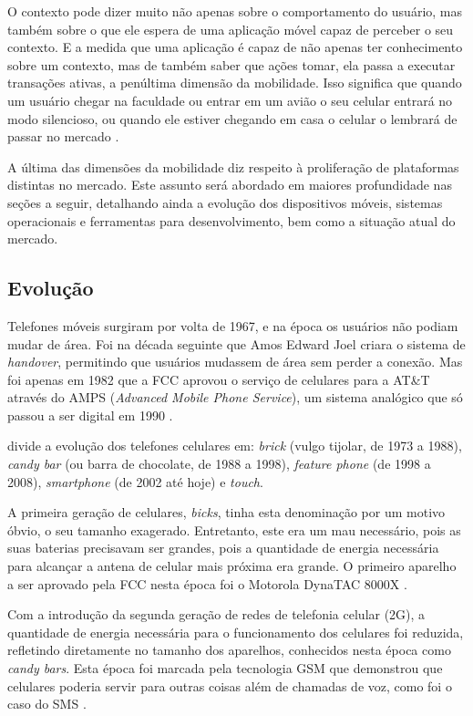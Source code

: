 \documentclass[diss]{template/setrem}
\begin{document}
O contexto pode dizer muito não apenas sobre o comportamento do usuário, mas também sobre o que ele espera de uma aplicação móvel capaz de perceber o seu contexto. E a medida que uma aplicação é capaz de não apenas ter conhecimento sobre um contexto, mas de também saber que ações tomar, ela passa a executar transações ativas, a penúltima dimensão da mobilidade. Isso significa que quando um usuário chegar na faculdade ou entrar em um avião o seu celular entrará no modo silencioso, ou quando ele estiver chegando em casa o celular o lembrará de passar no mercado \citep{Fling2009, BFar2004}.

A última das dimensões da mobilidade diz respeito à proliferação de plataformas distintas no mercado. Este assunto será abordado em maiores profundidade nas seções a seguir, detalhando ainda a evolução dos dispositivos móveis, sistemas operacionais e ferramentas para desenvolvimento, bem como a situação atual do mercado.

\subsection{Evolução}
Telefones móveis surgiram por volta de 1967, e na época os usuários não podiam mudar de área. Foi na década seguinte que Amos Edward Joel criara o sistema de \emph{handover}, permitindo que usuários mudassem de área sem perder a conexão. Mas foi apenas em 1982 que a FCC aprovou o serviço de celulares para a AT\&T através do AMPS (\emph{Advanced Mobile Phone Service}), um sistema analógico que só passou a ser digital em 1990 \citep{Spencer2012}.

\citet{Fling2009} divide a evolução dos telefones celulares em: \emph{brick} (vulgo tijolar, de 1973 a 1988), \emph{candy bar} (ou barra de chocolate, de 1988 a 1998), \emph{feature phone} (de 1998 a 2008), \emph{smartphone} (de 2002 até hoje) e \emph{touch}.

A primeira geração de celulares, \emph{bicks}, tinha esta denominação por um motivo óbvio, o seu tamanho exagerado. Entretanto, este era um mau necessário, pois as suas baterias precisavam ser grandes, pois a quantidade de energia necessária para alcançar a antena de celular mais próxima era grande. O primeiro aparelho a ser aprovado pela FCC nesta época foi o Motorola DynaTAC 8000X \citep{Fling2009}.

Com a introdução da segunda geração de redes de telefonia celular (2G), a quantidade de energia necessária para o funcionamento dos celulares foi reduzida, refletindo diretamente no tamanho dos aparelhos, conhecidos nesta época como \emph{candy bars}. Esta época foi marcada pela tecnologia GSM que demonstrou que celulares poderia servir para outras coisas além de chamadas de voz, como foi o caso do SMS \citep{Fling2009}.
\end{document}
